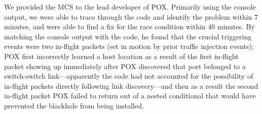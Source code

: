 We provided the MCS to the lead developer of POX. Primarily using the
console output, we were able to trace through the code and identify the problem
within 7 minutes, and were able to find a fix for the race condition within 40
minutes. By matching the console output with the code, he found that the crucial
triggering events were two
in-flight packets (set in motion by prior traffic injection events):
POX first incorrectly learned a host location as a result of the first in-flight
packet showing up immediately after POX discovered that port belonged to
a switch-switch link---apparently the code had not accounted for the
possibility of in-flight packets directly following link discovery---and
then as a result the
second in-flight packet
POX failed to return out of a nested conditional that would have
prevented the blackhole from being installed.\\[0.5ex]
